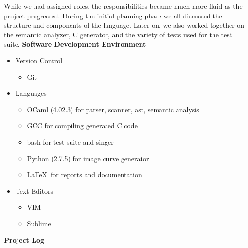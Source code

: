 \documentclass[11pt, oneside]{article}   	%
\begin{document}
While we had assigned roles, the responsibilities became much more fluid as the project progressed. During the initial planning phase we all discussed the structure and components of the language. Later on, we also worked together on the semantic analyzer, C generator, and the variety of tests used for the test suite.
\newpage
\Large\textbf{Software Development Environment}\\[1em]
\normalsize
\begin{itemize}
  \item Version Control
  \begin{itemize}
    \item Git
  \end{itemize}
  \item Languages
  \begin{itemize}
    \item OCaml (4.02.3) for parser, scanner, ast, semantic analysis
    \item GCC for compiling generated C code
    \item bash for test suite and singer
    \item Python (2.7.5) for image curve generator
    \item \LaTeX\ for reports and documentation
  \end{itemize}
  \item Text Editors 
    \begin{itemize}
    \item VIM
    \item Sublime
    \end{itemize}
\end{itemize}

\newpage
\Large\textbf{Project Log}\\[1em]
\normalsize

\end{document}
